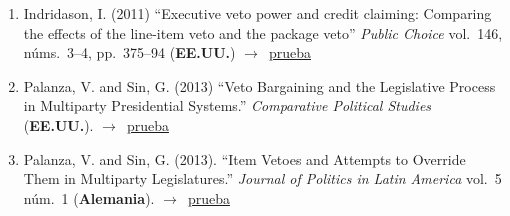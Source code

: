 \documentclass[12 pt, letter]{article}
\newenvironment{CitasMiTrabajo}{
    \begin{footnotesize}
    \begin{enumerate}[label={\footnotesize\emph{cita~\arabic*}},ref=\arabic*] %
        \setlength{\itemsep}{.1\itemsep}
        \setlength{\parskip}{.1\parskip}
    }{\end{enumerate}\end{footnotesize}}
\begin{document}
\begin{CitasMiTrabajo}
        \item Indridason, I. (2011) ``Executive veto power and credit claiming: Comparing the effects of the line-item veto and the package veto''
            \emph{Public Choice} vol.\ 146, n\'ums.\ 3--4, pp.~375--94 (\textbf{EE.UU.}) $\rightarrow$~\href{https://github.com/emagar/cv/blob/master/citasMiTrab/BullyPulpits/indridasson2011pubcho.pdf}{prueba}

        \item Palanza, V. and Sin, G. (2013) ``Veto Bargaining and the Legislative Process in Multiparty Presidential Systems.'' \emph{Comparative Political Studies} (\textbf{EE.UU.}). $\rightarrow$~\href{https://github.com/emagar/cv/blob/master/citasMiTrab/BullyPulpits/palanza.sin2013jpla.excerpts.pdf}{prueba}

        \item Palanza, V. and Sin, G. (2013). ``Item Vetoes and Attempts to Override Them in Multiparty Legislatures.'' \emph{Journal of Politics in Latin America} vol.~5 n\'um.~1 (\textbf{Alemania}). $\rightarrow$~\href{https://github.com/emagar/cv/blob/master/citasMiTrab/BullyPulpits/sin.palanza2014cps.excerpts.pdf}{prueba}


        \label{ncites:magar.2001} %





        \end{CitasMiTrabajo}
\end{document}
